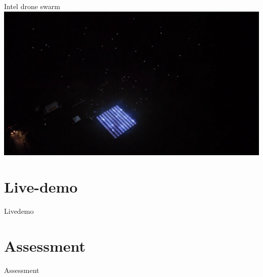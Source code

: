 \documentclass[aspectratio=169]{beamer}
\begin{document}
\begin{frame}{Intel drone swarm}
        	\centering
            \href{run:./videos/Intel.mp4?autostart}
            {\includegraphics[width=\linewidth]{images/intel.png}}
\end{frame}


\section{Live-demo}
\begin{frame}{Livedemo}
\end{frame}

\section{Assessment}
\begin{frame}{Assessment}
\end{frame}
\end{document}
